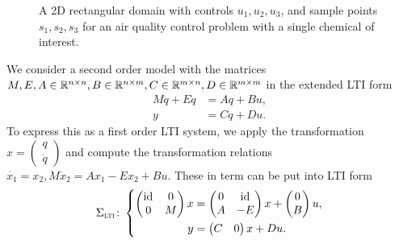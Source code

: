 \begin{example}
\begin{figure}[h]
        \caption{A 2D rectangular domain with controls $u_1, u_2, u_3$, and sample points $s_1, s_2, s_3$ for an air quality control problem with a single chemical of interest.}%
        \label{fig:air-quality}
    \end{figure}
\end{example}

\begin{example}\label{ex:casting-second-order}
    We consider a second order model with the matrices $M, E, A \in \mathbb{R}^{n \times n}, B \in \mathbb{R}^{n \times m}, C \in \mathbb{R}^{m \times n}, D \in \mathbb{R}^{m \times m}$ in the extended \ac{LTI} form
    \begin{align*}
        M \ddot{q} + E \dot{q} &= A q + B u, \\
        y &= C q + D u.
    \end{align*}
    To express this as a first order \ac{LTI} system, we apply the transformation $x = \begin{pmatrix}
        q \\
        \dot{q}
    \end{pmatrix}$
    and compute the transformation relations $\dot{x_1} = x_2, M \dot{x}_2 = A x_1 - E x_2 + Bu$.
    These in term can be put into \ac{LTI} form
    \begin{equation*}
        \Sigma_{\textnormal{\scshape lti}} \colon \left\lbrace
        \begin{aligned}
            \begin{pmatrix}
                \text{id}_{} & 0 \\
                0 & M
            \end{pmatrix} x &= \begin{pmatrix}
                0 & \text{id}_{} \\
                A & -E
            \end{pmatrix} x + \begin{pmatrix}
                0 \\
                B
            \end{pmatrix} u, \\
            y &= \begin{pmatrix}
                C & 0
            \end{pmatrix} x + D u.
        \end{aligned}
        \right.
    \end{equation*}
\end{example}


